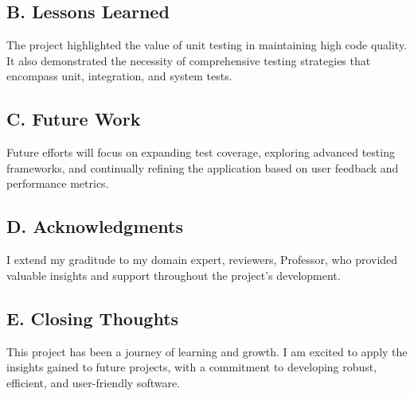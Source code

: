 \documentclass[12pt]{article}
\begin{document}
\subsection*{B. Lessons Learned}
The project highlighted the value of unit testing in maintaining high code quality. It also demonstrated the necessity of comprehensive testing strategies that encompass unit, integration, and system tests.

\subsection*{C. Future Work}
Future efforts will focus on expanding test coverage, exploring advanced testing frameworks, and continually refining the application based on user feedback and performance metrics.

\subsection*{D. Acknowledgments}
I extend my graditude to my domain expert, reviewers, Professor, who provided valuable insights and support throughout the project's development.

\subsection*{E. Closing Thoughts}
This project has been a journey of learning and growth. I am excited to apply the insights gained to future projects, with a commitment to developing robust, efficient, and user-friendly software.
\end{document}
